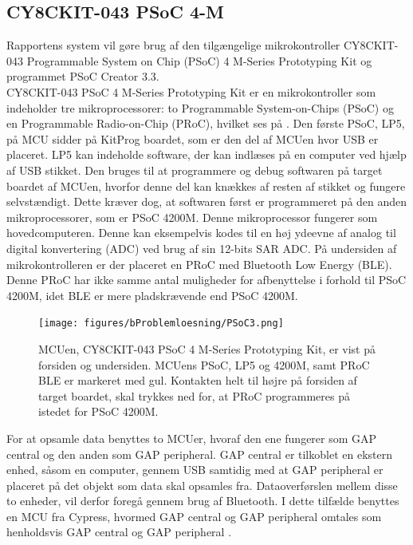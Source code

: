 \subsection{CY8CKIT-043 PSoC 4-M}
Rapportens system vil gøre brug af den tilgængelige mikrokontroller CY8CKIT-043 Programmable System on Chip (PSoC) 4 M-Series Prototyping Kit og programmet PSoC Creator 3.3.\\
CY8CKIT-043 PSoC 4 M-Series Prototyping Kit er en mikrokontroller som indeholder tre mikroprocessorer: to Programmable System-on-Chips (PSoC) og en Programmable Radio-on-Chip (PRoC), hvilket ses på . Den første PSoC, LP5, på MCU sidder på KitProg boardet, som er den del af MCUen hvor USB er placeret. LP5 kan indeholde software, der kan indlæses på en computer ved hjælp af USB stikket. Den bruges til at programmere og debug softwaren på target boardet af MCUen, hvorfor denne del kan knækkes af resten af stikket og fungere selvstændigt. Dette kræver dog, at softwaren først er programmeret på den anden mikroprocessorer, som er PSoC 4200M. Denne mikroprocessor fungerer som hovedcomputeren. Denne kan eksempelvis kodes til en høj ydeevne af analog til digital konvertering (ADC) ved brug af sin 12-bits SAR ADC. \newline
På undersiden af mikrokontrolleren er der placeret en PRoC med Bluetooth Low Energy (BLE). Denne PRoC har ikke samme antal muligheder for afbenyttelse i forhold til PSoC 4200M, idet BLE er mere pladskrævende end PSoC 4200M. \citep{CYPRESS2016PSoC,Semiconductor2016,CYPRESS2016Cortexm0}
%
\begin{figure}[H]
	\centering
	\texttt{[image: figures/bProblemloesning/PSoC3.png]}
	\caption{MCUen, CY8CKIT-043 PSoC 4 M-Series Prototyping Kit, er vist på forsiden og undersiden. MCUens PSoC, LP5 og 4200M, samt PRoC BLE er markeret med gul.\newline
	 Kontakten helt til højre på forsiden af target boardet, skal trykkes ned for, at PRoC programmeres på istedet for PSoC 4200M. \citep{CYPRESS2016PSoC,Semiconductor2016}}
	\label{fig:PSoC}
\end{figure}\vspace{-0.2cm}
%
For at opsamle data benyttes to MCUer, hvoraf den ene fungerer som GAP central og den anden som GAP peripheral. GAP central er tilkoblet en ekstern enhed, såsom en computer, gennem USB samtidig med at GAP peripheral er placeret på det objekt som data skal opsamles fra. Dataoverførslen mellem disse to enheder, vil derfor foregå gennem brug af Bluetooth. I dette tilfælde benyttes en MCU fra Cypress, hvormed GAP central og GAP peripheral omtales som henholdsvis GAP central og GAP peripheral \citep{Luthra2015}. 

